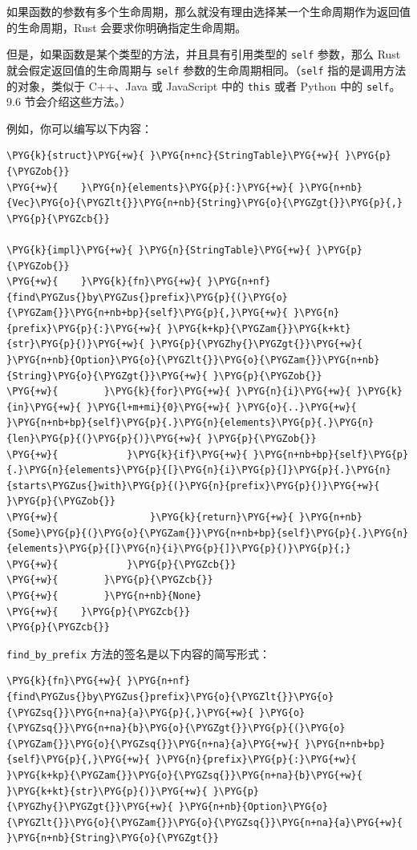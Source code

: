 如果函数的参数有多个生命周期，那么就没有理由选择某一个生命周期作为返回值的生命周期，Rust 会要求你明确指定生命周期。

但是，如果函数是某个类型的方法，并且具有引用类型的 \texttt{self} 参数，那么 Rust 就会假定返回值的生命周期与 \texttt{self} 参数的生命周期相同。（\texttt{self} 指的是调用方法的对象，类似于 C++、Java 或 JavaScript 中的 \texttt{this} 或者 Python 中的 \texttt{self}。9.6 节会介绍这些方法。）

例如，你可以编写以下内容：

\begin{Verbatim}[commandchars=\\\{\},breaklines=true,breakanywhere=true,fontsize=\codefont,xleftmargin=17bp]
\PYG{k}{struct}\PYG{+w}{ }\PYG{n+nc}{StringTable}\PYG{+w}{ }\PYG{p}{\PYGZob{}}
\PYG{+w}{    }\PYG{n}{elements}\PYG{p}{:}\PYG{+w}{ }\PYG{n+nb}{Vec}\PYG{o}{\PYGZlt{}}\PYG{n+nb}{String}\PYG{o}{\PYGZgt{}}\PYG{p}{,}
\PYG{p}{\PYGZcb{}}

\PYG{k}{impl}\PYG{+w}{ }\PYG{n}{StringTable}\PYG{+w}{ }\PYG{p}{\PYGZob{}}
\PYG{+w}{    }\PYG{k}{fn}\PYG{+w}{ }\PYG{n+nf}{find\PYGZus{}by\PYGZus{}prefix}\PYG{p}{(}\PYG{o}{\PYGZam{}}\PYG{n+nb+bp}{self}\PYG{p}{,}\PYG{+w}{ }\PYG{n}{prefix}\PYG{p}{:}\PYG{+w}{ }\PYG{k+kp}{\PYGZam{}}\PYG{k+kt}{str}\PYG{p}{)}\PYG{+w}{ }\PYG{p}{\PYGZhy{}\PYGZgt{}}\PYG{+w}{ }\PYG{n+nb}{Option}\PYG{o}{\PYGZlt{}}\PYG{o}{\PYGZam{}}\PYG{n+nb}{String}\PYG{o}{\PYGZgt{}}\PYG{+w}{ }\PYG{p}{\PYGZob{}}
\PYG{+w}{        }\PYG{k}{for}\PYG{+w}{ }\PYG{n}{i}\PYG{+w}{ }\PYG{k}{in}\PYG{+w}{ }\PYG{l+m+mi}{0}\PYG{+w}{ }\PYG{o}{..}\PYG{+w}{ }\PYG{n+nb+bp}{self}\PYG{p}{.}\PYG{n}{elements}\PYG{p}{.}\PYG{n}{len}\PYG{p}{(}\PYG{p}{)}\PYG{+w}{ }\PYG{p}{\PYGZob{}}
\PYG{+w}{            }\PYG{k}{if}\PYG{+w}{ }\PYG{n+nb+bp}{self}\PYG{p}{.}\PYG{n}{elements}\PYG{p}{[}\PYG{n}{i}\PYG{p}{]}\PYG{p}{.}\PYG{n}{starts\PYGZus{}with}\PYG{p}{(}\PYG{n}{prefix}\PYG{p}{)}\PYG{+w}{ }\PYG{p}{\PYGZob{}}
\PYG{+w}{                }\PYG{k}{return}\PYG{+w}{ }\PYG{n+nb}{Some}\PYG{p}{(}\PYG{o}{\PYGZam{}}\PYG{n+nb+bp}{self}\PYG{p}{.}\PYG{n}{elements}\PYG{p}{[}\PYG{n}{i}\PYG{p}{]}\PYG{p}{)}\PYG{p}{;}
\PYG{+w}{            }\PYG{p}{\PYGZcb{}}
\PYG{+w}{        }\PYG{p}{\PYGZcb{}}
\PYG{+w}{        }\PYG{n+nb}{None}
\PYG{+w}{    }\PYG{p}{\PYGZcb{}}
\PYG{p}{\PYGZcb{}}
\end{Verbatim}

\texttt{find\_by\_prefix} 方法的签名是以下内容的简写形式：

\begin{Verbatim}[commandchars=\\\{\},breaklines=true,breakanywhere=true,fontsize=\codefont,xleftmargin=17bp]
\PYG{k}{fn}\PYG{+w}{ }\PYG{n+nf}{find\PYGZus{}by\PYGZus{}prefix}\PYG{o}{\PYGZlt{}}\PYG{o}{\PYGZsq{}}\PYG{n+na}{a}\PYG{p}{,}\PYG{+w}{ }\PYG{o}{\PYGZsq{}}\PYG{n+na}{b}\PYG{o}{\PYGZgt{}}\PYG{p}{(}\PYG{o}{\PYGZam{}}\PYG{o}{\PYGZsq{}}\PYG{n+na}{a}\PYG{+w}{ }\PYG{n+nb+bp}{self}\PYG{p}{,}\PYG{+w}{ }\PYG{n}{prefix}\PYG{p}{:}\PYG{+w}{ }\PYG{k+kp}{\PYGZam{}}\PYG{o}{\PYGZsq{}}\PYG{n+na}{b}\PYG{+w}{ }\PYG{k+kt}{str}\PYG{p}{)}\PYG{+w}{ }\PYG{p}{\PYGZhy{}\PYGZgt{}}\PYG{+w}{ }\PYG{n+nb}{Option}\PYG{o}{\PYGZlt{}}\PYG{o}{\PYGZam{}}\PYG{o}{\PYGZsq{}}\PYG{n+na}{a}\PYG{+w}{ }\PYG{n+nb}{String}\PYG{o}{\PYGZgt{}}
\end{Verbatim}

